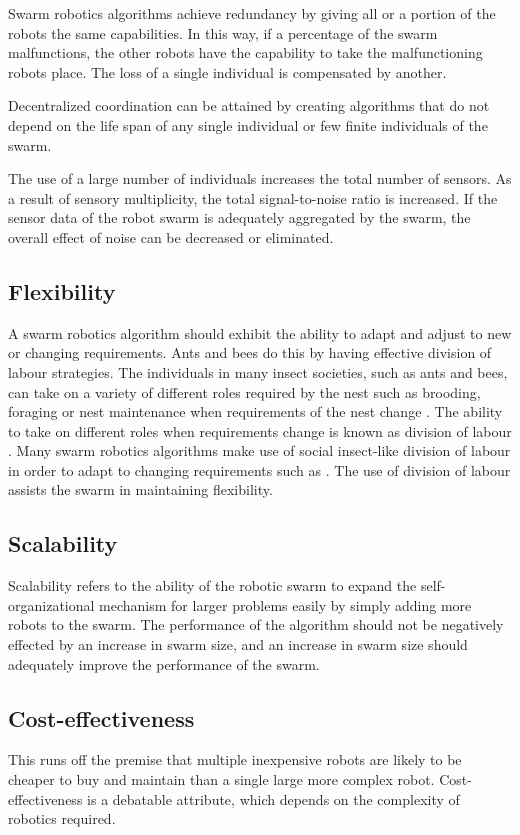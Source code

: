 Swarm robotics algorithms achieve redundancy by giving all or a portion of the robots the same capabilities. In this way, if a percentage of the swarm malfunctions, the other robots have the capability to take the malfunctioning robots place. The loss of a single individual is compensated by another.

Decentralized coordination can be attained by creating algorithms that do not depend on the life span of any single individual or few finite individuals of the swarm.

The use of a large number of individuals increases the total number of sensors.  As a result of sensory multiplicity, the total signal-to-noise ratio is increased. If the sensor data of the robot swarm is adequately aggregated by the swarm, the overall effect of noise can be decreased or eliminated. 

\subsection{Flexibility}

A swarm robotics algorithm should exhibit the ability to adapt and adjust to new or changing requirements. Ants and bees do this by having effective division of labour strategies. The individuals in many insect societies, such as ants and bees, can take on a variety of different roles required by the nest such as brooding, foraging or nest maintenance when requirements of the nest change \cite{morley1946division}. The ability to take on different roles when requirements change is known as division of labour \cite{beshers2001models}. Many swarm robotics algorithms make use of social insect-like division of labour in order to adapt to changing requirements such as \cite{labella2006division, liu2007towards, gerkey2004formal}. The use of division of labour assists the swarm in maintaining flexibility.

\subsection{Scalability}
Scalability refers to the ability of the robotic swarm to expand the self-organizational mechanism for larger problems easily by simply adding more robots to the swarm. The performance of the algorithm should not be negatively effected by an increase in swarm size, and an increase in swarm size should adequately improve the performance of the swarm. 

\subsection{Cost-effectiveness}
This runs off the premise that multiple inexpensive robots are likely to be cheaper to buy and maintain than a single large more complex robot. Cost-effectiveness is a debatable attribute, which depends on the complexity of robotics required. 

